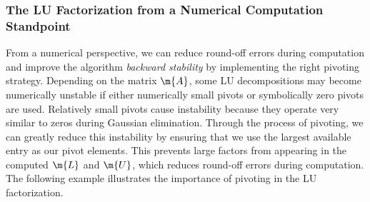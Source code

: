 \subsubsection{The LU Factorization from a Numerical Computation Standpoint}

From a numerical perspective, we can reduce round-off errors during computation and improve the algorithm \emph{backward stability} by implementing the right pivoting strategy. Depending on the matrix $\m{A}$, some \ac{LU} decompositions may become numerically unstable if either numerically small pivots or symbolically zero pivots are used. Relatively small pivots cause instability because they operate very similar to zeros during Gaussian elimination. Through the process of pivoting, we can greatly reduce this instability by ensuring that we use the largest available entry as our pivot elements. This prevents large factors from appearing in the computed $\m{L}$ and $\m{U}$, which reduces round-off errors during computation. The following example illustrates the importance of pivoting in the \ac{LU} factorization.


